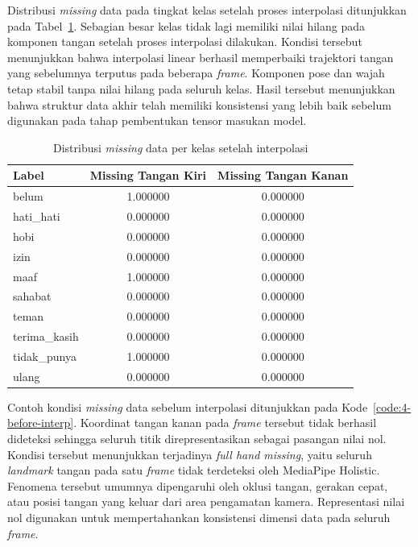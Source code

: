 Distribusi \textit{missing} data pada tingkat kelas setelah proses interpolasi ditunjukkan pada Tabel~\ref{tab:4-missing-per-label}. 
Sebagian besar kelas tidak lagi memiliki nilai hilang pada komponen tangan setelah proses interpolasi dilakukan. 
Kondisi tersebut menunjukkan bahwa interpolasi linear berhasil memperbaiki trajektori tangan yang sebelumnya terputus pada beberapa \textit{frame}. 
Komponen pose dan wajah tetap stabil tanpa nilai hilang pada seluruh kelas. 
Hasil tersebut menunjukkan bahwa struktur data akhir telah memiliki konsistensi yang lebih baik sebelum digunakan pada tahap pembentukan tensor masukan model.

\begin{table}[H]
\centering
\caption{Distribusi \textit{missing} data per kelas setelah interpolasi}
\label{tab:4-missing-per-label}
\begin{tabular}{|l|c|c|}
\hline
\textbf{Label} & \textbf{Missing Tangan Kiri} & \textbf{Missing Tangan Kanan} \\ \hline
belum & 1.000000 & 0.000000 \\ \hline
hati\_hati & 0.000000 & 0.000000 \\ \hline
hobi & 0.000000 & 0.000000 \\ \hline
izin & 0.000000 & 0.000000 \\ \hline
maaf & 1.000000 & 0.000000 \\ \hline
sahabat & 0.000000 & 0.000000 \\ \hline
teman & 0.000000 & 0.000000 \\ \hline
terima\_kasih & 0.000000 & 0.000000 \\ \hline
tidak\_punya & 1.000000 & 0.000000 \\ \hline
ulang & 0.000000 & 0.000000 \\ \hline
\end{tabular}
\end{table}

Contoh kondisi \textit{missing} data sebelum interpolasi ditunjukkan pada Kode~\ref{code:4-before-interp}. 
Koordinat tangan kanan pada \textit{frame} tersebut tidak berhasil dideteksi sehingga seluruh titik direpresentasikan sebagai pasangan nilai nol. 
Kondisi tersebut menunjukkan terjadinya \textit{full hand missing}, yaitu seluruh \textit{landmark} tangan pada satu \textit{frame} tidak terdeteksi oleh MediaPipe Holistic. 
Fenomena tersebut umumnya dipengaruhi oleh oklusi tangan, gerakan cepat, atau posisi tangan yang keluar dari area pengamatan kamera. 
Representasi nilai nol digunakan untuk mempertahankan konsistensi dimensi data pada seluruh \textit{frame}.

